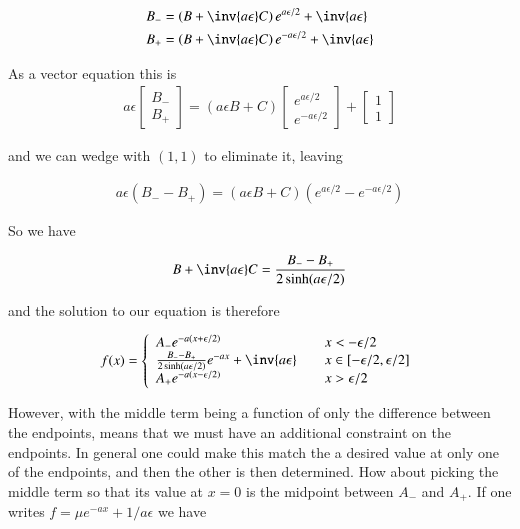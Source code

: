 \begin{align*}
B_{-} &= \left(B + \inv{a \epsilon } C \right) e^{a \epsilon/2} + \inv{a \epsilon} \\
B_{+} &= \left(B + \inv{a \epsilon } C \right) e^{-a \epsilon/2} + \inv{a \epsilon} \\
\end{align*}

As a vector equation this is
\begin{align*}
a \epsilon
\begin{bmatrix}
B_{-} \\
B_{+} 
\end{bmatrix}
=
\left(a \epsilon B + C \right) 
\begin{bmatrix}
e^{a \epsilon/2} \\
e^{-a \epsilon/2} 
\end{bmatrix}
+
\begin{bmatrix}
1 \\
1
\end{bmatrix}
\end{align*}

and we can wedge with $(1,1)$ to eliminate it, leaving

\begin{align*}
a \epsilon
(B_{-} - B_{+})
=
\left(a \epsilon B + C \right) 
(e^{a \epsilon/2} - e^{-a \epsilon/2})
\end{align*}

So we have

\begin{align*}
B + \inv{a \epsilon}C = \frac{B_{-} - B_{+}}{2 \sinh(a \epsilon/2)}
\end{align*}

and the solution to our equation is therefore

\begin{align*}
f(x) = 
\left\{
\begin{array}{l l}
A_{-} e^{-a(x + \epsilon/2)} & \quad x < -\epsilon/2 \\
\frac{B_{-} - B_{+}}{2 \sinh(a \epsilon/2)} e^{-ax} + \inv{a \epsilon} & \quad x \in \left[-\epsilon/2, \epsilon/2 \right] \\
A_{+} e^{-a(x - \epsilon/2)} & \quad x > \epsilon/2 \\
\end{array} \right.
\end{align*}

However, with the middle term being a function of only the difference between the endpoints, means that we must have an additional constraint on the endpoints.  In general one could make this match the a desired value at only one of the endpoints, and then the other is then determined.  How about picking the middle term so that its value at $x=0$ is the midpoint between $A_{-}$ and $A_{+}$.  If one writes $f = \mu e^{-ax} + 1/a \epsilon$ we have


